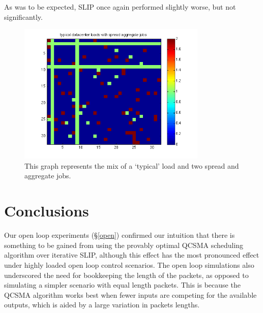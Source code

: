 \documentclass{IEEEtran}%
\begin{document}
As was to be expected, SLIP once again performed slightly worse, but not significantly.
\begin{figure}%
	 \includegraphics[width=90mm]{typ_spread_flows.png}
	\caption{This graph represents the mix of a `typical' load and two spread and aggregate jobs.}
	\label{typ_spread_flows}
\end{figure}

%


\section{Conclusions}

Our open loop experiments (\S\ref{open}) confirmed our intuition that there is something to be gained from using the provably optimal QCSMA scheduling algorithm over iterative SLIP, although this effect has the most pronounced effect under highly loaded open loop control scenarios.  The open loop simulations also underscored the need for bookkeeping the length of the packets, as opposed to simulating a simpler scenario with equal length packets.  This is because the QCSMA algorithm works best when fewer inputs are competing for the available outputs, which is aided by a large variation in packets lengths.
\end{document}
